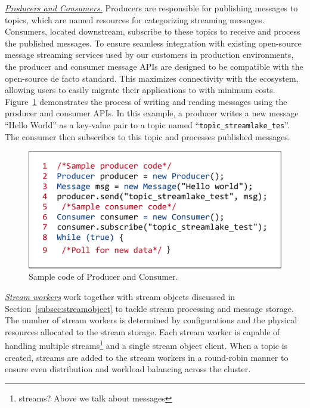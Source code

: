 \noindent\underline{\textit{Producers and Consumers.}} Producers are responsible for publishing messages to topics, which are named resources for categorizing streaming messages. Consumers, located downstream, subscribe to these topics to receive and process the published messages. To ensure seamless integration with existing open-source message streaming services used by our customers in production environments, the producer and consumer message APIs are designed to be compatible with the open-source de facto standard. This maximizes connectivity with the ecosystem, allowing users to easily migrate their applications to \sys with minimum costs. Figure~\ref{fig:producer}  demonstrates the process of writing and reading messages using the producer and consumer APIs. In this example, a producer writes a new message ``Hello World'' as a key-value pair to a topic named ``\texttt{topic\_streamlake\_tes}''. The consumer then subscribes to this topic and processes published messages.

\begin{figure}[htbp]
	\includegraphics[scale=0.3]{figures/producer}
	\centering
	\vspace{-1em}
	\caption{Sample code of Producer and Consumer.}
	\label{fig:producer}
	\vspace{-1em}
\end{figure}

\noindent\underline{\textit{Stream workers}} work together with stream objects discussed in Section~\ref{subsec:streamobject} to tackle stream processing and message storage. The number of stream workers is determined by configurations and the physical resources allocated to the stream storage. Each stream worker is capable of handling multiple streams\footnote{streams? Above we talk about messages} and a single stream object client. When a topic is created, streams are added to the stream workers in a round-robin manner to ensure even distribution and workload balancing across the cluster.

